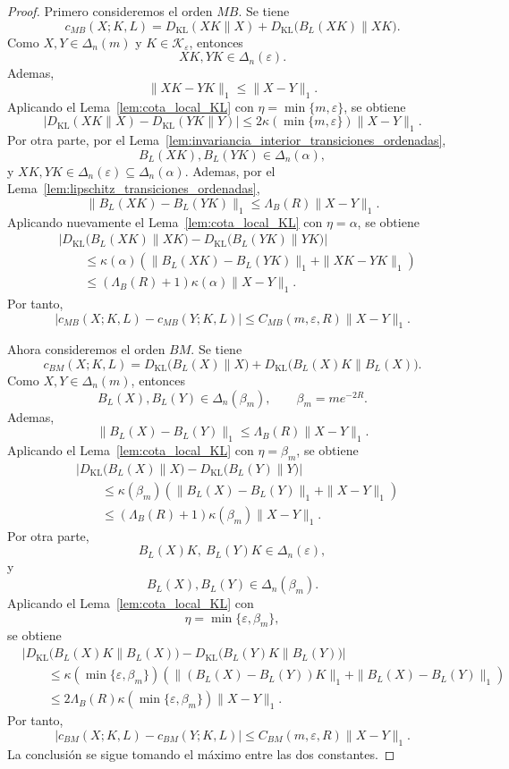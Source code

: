 ﻿\documentclass[12pt]{article}
\begin{document}
\begin{proof}
Primero consideremos el orden \(MB\). Se tiene
\[
c_{MB}(X;K,L)
=
D_{\mathrm{KL}}(XK\|X)
+
D_{\mathrm{KL}}\bigl(B_L(XK)\|XK\bigr).
\]
Como \(X,Y\in\Delta_n(m)\) y \(K\in\mathcal K_\varepsilon\), entonces
\[
XK,YK\in\Delta_n(\varepsilon).
\]
Ademas,
\[
\|XK-YK\|_1\le \|X-Y\|_1.
\]
Aplicando el Lema~\ref{lem:cota_local_KL} con \(\eta=\min\{m,\varepsilon\}\), se obtiene
\[
\left|
D_{\mathrm{KL}}(XK\|X)
-
D_{\mathrm{KL}}(YK\|Y)
\right|
\le
2\kappa(\min\{m,\varepsilon\})\|X-Y\|_1.
\]
Por otra parte, por el Lema~\ref{lem:invariancia_interior_transiciones_ordenadas},
\[
B_L(XK),B_L(YK)\in\Delta_n(\alpha),
\]
y \(XK,YK\in\Delta_n(\varepsilon)\subseteq\Delta_n(\alpha)\). Ademas, por el Lema~\ref{lem:lipschitz_transiciones_ordenadas},
\[
\|B_L(XK)-B_L(YK)\|_1
\le
\Lambda_B(R)\|X-Y\|_1.
\]
Aplicando nuevamente el Lema~\ref{lem:cota_local_KL} con \(\eta=\alpha\), se obtiene
\[
\begin{aligned}
&
\left|
D_{\mathrm{KL}}\bigl(B_L(XK)\|XK\bigr)
-
D_{\mathrm{KL}}\bigl(B_L(YK)\|YK\bigr)
\right|
\\
&\qquad
\le
\kappa(\alpha)
\left(
\|B_L(XK)-B_L(YK)\|_1
+
\|XK-YK\|_1
\right)
\\
&\qquad
\le
(\Lambda_B(R)+1)\kappa(\alpha)\|X-Y\|_1.
\end{aligned}
\]
Por tanto,
\[
|c_{MB}(X;K,L)-c_{MB}(Y;K,L)|
\le
C_{MB}(m,\varepsilon,R)\|X-Y\|_1.
\]

Ahora consideremos el orden \(BM\). Se tiene
\[
c_{BM}(X;K,L)
=
D_{\mathrm{KL}}\bigl(B_L(X)\|X\bigr)
+
D_{\mathrm{KL}}\bigl(B_L(X)K\|B_L(X)\bigr).
\]
Como \(X,Y\in\Delta_n(m)\), entonces
\[
B_L(X),B_L(Y)\in\Delta_n(\beta_m),
\qquad
\beta_m=me^{-2R}.
\]
Ademas,
\[
\|B_L(X)-B_L(Y)\|_1
\le
\Lambda_B(R)\|X-Y\|_1.
\]
Aplicando el Lema~\ref{lem:cota_local_KL} con \(\eta=\beta_m\), se obtiene
\[
\begin{aligned}
&
\left|
D_{\mathrm{KL}}\bigl(B_L(X)\|X\bigr)
-
D_{\mathrm{KL}}\bigl(B_L(Y)\|Y\bigr)
\right|
\\
&\qquad
\le
\kappa(\beta_m)
\left(
\|B_L(X)-B_L(Y)\|_1+\|X-Y\|_1
\right)
\\
&\qquad
\le
(\Lambda_B(R)+1)\kappa(\beta_m)\|X-Y\|_1.
\end{aligned}
\]
Por otra parte,
\[
B_L(X)K,\ B_L(Y)K\in\Delta_n(\varepsilon),
\]
y
\[
B_L(X),B_L(Y)\in\Delta_n(\beta_m).
\]
Aplicando el Lema~\ref{lem:cota_local_KL} con
\[
\eta=\min\{\varepsilon,\beta_m\},
\]
se obtiene
\[
\begin{aligned}
&
\left|
D_{\mathrm{KL}}\bigl(B_L(X)K\|B_L(X)\bigr)
-
D_{\mathrm{KL}}\bigl(B_L(Y)K\|B_L(Y)\bigr)
\right|
\\
&\qquad
\le
\kappa(\min\{\varepsilon,\beta_m\})
\left(
\|(B_L(X)-B_L(Y))K\|_1
+
\|B_L(X)-B_L(Y)\|_1
\right)
\\
&\qquad
\le
2\Lambda_B(R)\kappa(\min\{\varepsilon,\beta_m\})\|X-Y\|_1.
\end{aligned}
\]
Por tanto,
\[
|c_{BM}(X;K,L)-c_{BM}(Y;K,L)|
\le
C_{BM}(m,\varepsilon,R)\|X-Y\|_1.
\]
La conclusión se sigue tomando el máximo entre las dos constantes.
\end{proof}
\end{document}
